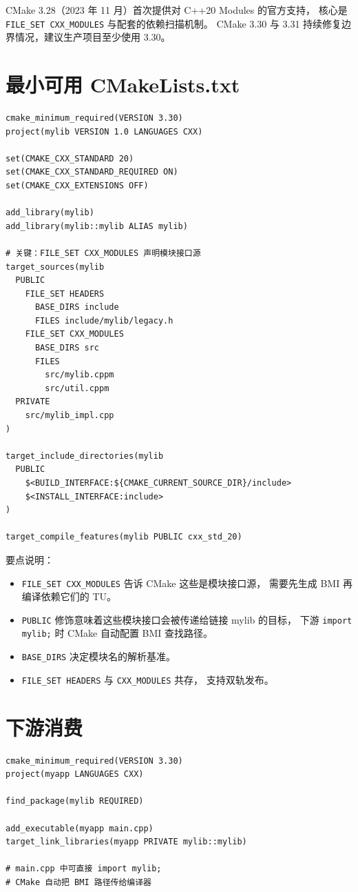 \documentclass[12pt,a4paper,fontset=fandol]{ctexbook}
\newcommand{\cmakelabel}{%
  \tcbox[on line,colback=cppheadbg!80!black,colframe=cppheadbg!80!black,
    boxrule=0pt,arc=1pt,left=2pt,right=2pt,top=1pt,bottom=1pt,
    colupper=white,fontupper=\scriptsize\bfseries]{CMake}}
\newcommand{\flag}[1]{\texttt{#1}}
\begin{document}
CMake 3.28（2023 年 11 月）首次提供对 C++20 Modules 的官方支持，
核心是 \flag{FILE\_SET CXX\_MODULES} 与配套的依赖扫描机制。
CMake 3.30 与 3.31 持续修复边界情况，建议生产项目至少使用 3.30。

\section{最小可用 CMakeLists.txt}

\cmakelabel
\begin{lstlisting}[style=cmakestyle]
cmake_minimum_required(VERSION 3.30)
project(mylib VERSION 1.0 LANGUAGES CXX)

set(CMAKE_CXX_STANDARD 20)
set(CMAKE_CXX_STANDARD_REQUIRED ON)
set(CMAKE_CXX_EXTENSIONS OFF)

add_library(mylib)
add_library(mylib::mylib ALIAS mylib)

# 关键：FILE_SET CXX_MODULES 声明模块接口源
target_sources(mylib
  PUBLIC
    FILE_SET HEADERS
      BASE_DIRS include
      FILES include/mylib/legacy.h
    FILE_SET CXX_MODULES
      BASE_DIRS src
      FILES
        src/mylib.cppm
        src/util.cppm
  PRIVATE
    src/mylib_impl.cpp
)

target_include_directories(mylib
  PUBLIC
    $<BUILD_INTERFACE:${CMAKE_CURRENT_SOURCE_DIR}/include>
    $<INSTALL_INTERFACE:include>
)

target_compile_features(mylib PUBLIC cxx_std_20)
\end{lstlisting}

要点说明：

\begin{itemize}
  \item \flag{FILE\_SET CXX\_MODULES} 告诉 CMake 这些是模块接口源，
        需要先生成 BMI 再编译依赖它们的 TU。
  \item \flag{PUBLIC} 修饰意味着这些模块接口会被传递给链接 mylib 的目标，
        下游 \flag{import mylib;} 时 CMake 自动配置 BMI 查找路径。
  \item \flag{BASE\_DIRS} 决定模块名的解析基准。
  \item \flag{FILE\_SET HEADERS} 与 \flag{CXX\_MODULES} 共存，
        支持双轨发布。
\end{itemize}

\section{下游消费}

\cmakelabel
\begin{lstlisting}[style=cmakestyle]
cmake_minimum_required(VERSION 3.30)
project(myapp LANGUAGES CXX)

find_package(mylib REQUIRED)

add_executable(myapp main.cpp)
target_link_libraries(myapp PRIVATE mylib::mylib)

# main.cpp 中可直接 import mylib;
# CMake 自动把 BMI 路径传给编译器
\end{lstlisting}
\end{document}
